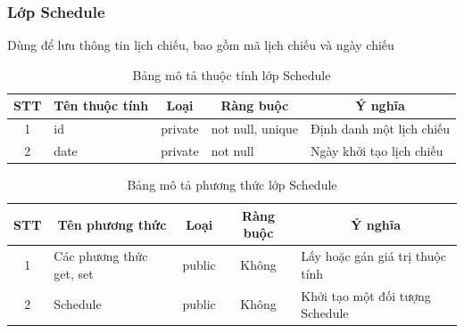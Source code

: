 \documentclass[a4paper, 12pt]{article}
\begin{document}
\subsubsection{Lớp Schedule}
Dùng để lưu thông tin lịch chiếu, bao gồm mã lịch chiếu và ngày chiếu 
\begin{table}[H]
	\begin{center}
		\begin{tabular}{|c|l|c|l|l|}
			\hline
			STT & \multicolumn{1}{c|}{Tên thuộc tính} & Loại                         & \multicolumn{1}{c|}{Ràng buộc} & \multicolumn{1}{c|}{Ý nghĩa} \\ \hline
			1   & id                                  & private                      & not null, unique               & Định danh một lịch chiếu     \\ \hline
			2   & date                                & \multicolumn{1}{l|}{private} & not null                       & Ngày khởi tạo lịch chiếu     \\ \hline
		\end{tabular}
		\caption{Bảng mô tả thuộc tính lớp Schedule}
	\end{center}
\end{table}

\begin{table}[H]
	\begin{center}
		\begin{tabular}{|c|l|c|c|l|}
			\hline
			STT & \multicolumn{1}{c|}{Tên phương thức} & Loại                        & \multicolumn{1}{c|}{Ràng buộc} & \multicolumn{1}{c|}{Ý nghĩa}    \\ \hline
			1   & Các phương thức get, set             & public                      &                   Không             & Lấy hoặc gán giá trị thuộc tính \\ \hline
			2   & Schedule                             & \multicolumn{1}{l|}{public} &                       Không         & Khởi tạo một đối tượng Schedule \\ \hline
		\end{tabular}
		\caption{Bảng mô tả phương thức lớp Schedule}
	\end {center}
\end{table}
\end{document}
